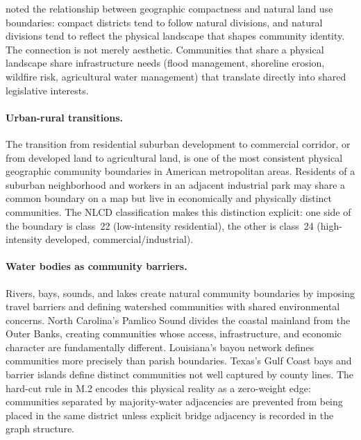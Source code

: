 \citet{schwartzberg1966reapportionment} noted the relationship between
geographic compactness and natural land use boundaries: compact districts tend
to follow natural divisions, and natural divisions tend to reflect the physical
landscape that shapes community identity.
The connection is not merely aesthetic.
Communities that share a physical landscape share infrastructure needs
(flood management, shoreline erosion, wildfire risk, agricultural water
management) that translate directly into shared legislative interests.

\paragraph{Urban-rural transitions.}
The transition from residential suburban development to commercial corridor,
or from developed land to agricultural land, is one of the most consistent
physical geographic community boundaries in American metropolitan areas.
Residents of a suburban neighborhood and workers in an adjacent industrial
park may share a common boundary on a map but live in economically and
physically distinct communities.
The NLCD classification makes this distinction explicit: one side of the
boundary is class~22 (low-intensity residential), the other is class~24
(high-intensity developed, commercial/industrial).

\paragraph{Water bodies as community barriers.}
Rivers, bays, sounds, and lakes create natural community boundaries by
imposing travel barriers and defining watershed communities with shared
environmental concerns.
North Carolina's Pamlico Sound divides the coastal mainland from the
Outer Banks, creating communities whose access, infrastructure, and
economic character are fundamentally different.
Louisiana's bayou network defines communities more precisely than parish
boundaries.
Texas's Gulf Coast bays and barrier islands define distinct communities
not well captured by county lines.
The hard-cut rule in M.2 encodes this physical reality as a zero-weight
edge: communities separated by majority-water adjacencies are prevented
from being placed in the same district unless explicit bridge adjacency
is recorded in the graph structure.
